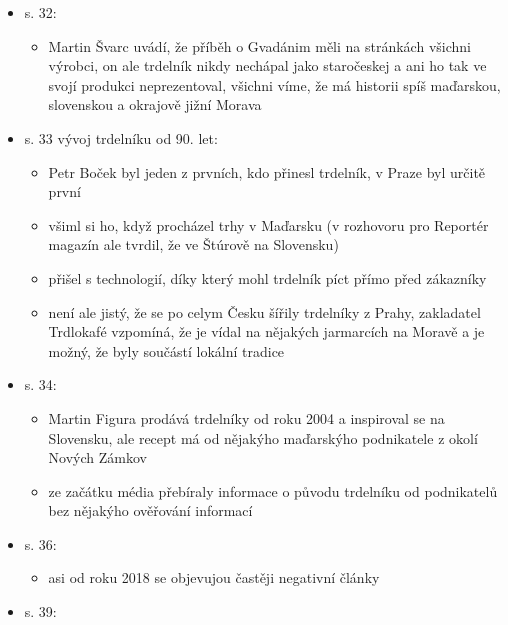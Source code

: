 \begin{itemize}
\begin{itemize}
    \begin{itemize}
    \tightlist
    \item
      je nepřesvědčivá, prodejci trdelníku jí využívají pro jeho vsazení
      do českýho prostředí
    \end{itemize}
  \item
    s. 32:

    \begin{itemize}
    \tightlist
    \item
      Martin Švarc uvádí, že příběh o Gvadánim měli na stránkách všichni
      výrobci, on ale trdelník nikdy nechápal jako staročeskej a ani ho
      tak ve svojí produkci neprezentoval, všichni víme, že má historii
      spíš maďarskou, slovenskou a okrajově jižní Morava
    \end{itemize}
  \item
    s. 33 vývoj trdelníku od 90. let:

    \begin{itemize}
    \tightlist
    \item
      Petr Boček byl jeden z prvních, kdo přinesl trdelník, v Praze byl
      určitě první
    \item
      všiml si ho, když procházel trhy v Maďarsku (v rozhovoru pro
      Reportér magazín ale tvrdil, že ve Štúrově na Slovensku)
    \item
      přišel s technologií, díky který mohl trdelník píct přímo před
      zákazníky
    \item
      není ale jistý, že se po celym Česku šířily trdelníky z Prahy,
      zakladatel Trdlokafé vzpomíná, že je vídal na nějakých jarmarcích
      na Moravě a je možný, že byly součástí lokální tradice
    \end{itemize}
  \item
    s. 34:

    \begin{itemize}
    \tightlist
    \item
      Martin Figura prodává trdelníky od roku 2004 a inspiroval se na
      Slovensku, ale recept má od nějakýho maďarskýho podnikatele z
      okolí Nových Zámkov
    \item
      ze začátku média přebíraly informace o původu trdelníku od
      podnikatelů bez nějakýho ověřování informací
    \end{itemize}
  \item
    s. 36:

    \begin{itemize}
    \tightlist
    \item
      asi od roku 2018 se objevujou častěji negativní články
    \end{itemize}
  \item
    s. 39:


\end{itemize}
\end{itemize}
